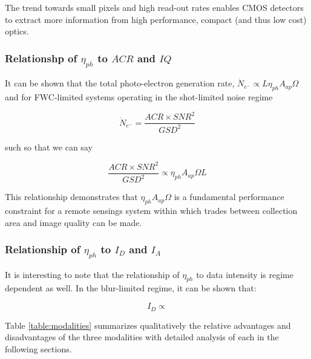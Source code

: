 \documentclass[10pt,journal]{IEEEtran}  %
\begin{document}
{\begin{observation}
The trend towards small pixels and high read-out rates enables CMOS detectors to extract more information from high performance, compact (and thus low cost) optics.
\end{observation}

\subsubsection{Relationshp of $\eta_{ph}$ to $ACR$ and $IQ$}

It can be shown that the total photo-electron generation rate, $\dot{N}_{e^-} \propto L\eta_{ph}A_{ap}\Omega$ and for FWC-limited systems operating in the shot-limited noise regime

\begin{equation}
    \dot{N}_{e^-} = \frac{ACR \times SNR^2}{GSD^2}
\end{equation}

such so that we can say

\begin{equation}
    \frac{ACR \times SNR^2}{GSD^2} \propto \eta_{ph} A_{ap}\Omega L
\end{equation}

This relationship demonstrates that $\eta_{ph}A_{ap}\Omega$ is a fundamental performance constraint for a remote sensings system within which trades between collection area and image quality can be made.

\subsubsection{Relationship of $\eta_{ph}$ to $I_{D}$ and $I_A$}

It is interesting to note that the relationship of $\eta_{ph}$ to data intensity is regime dependent as well.  In the blur-limited regime, it can be shown that:

\begin{equation}
    I_D \propto 
\end{equation}

Table \ref{table:modalities} summarizes qualitatively the relative advantages and disadvantages of the three modalities with detailed analysis of each in the following sections.

}
\end{document}
